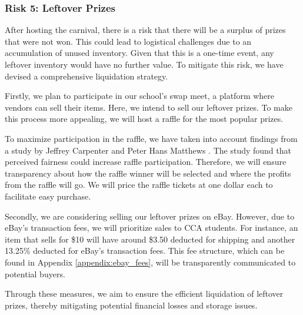 \subsubsection{Risk 5: Leftover Prizes}

After hosting the carnival, there is a risk that there will be a surplus of prizes that were not won. This could lead to logistical challenges due to an accumulation of unused inventory. Given that this is a one-time event, any leftover inventory would have no further value. To mitigate this risk, we have devised a comprehensive liquidation strategy.

Firstly, we plan to participate in our school's swap meet, a platform where vendors can sell their items. Here, we intend to sell our leftover prizes. To make this process more appealing, we will host a raffle for the most popular prizes.

To maximize participation in the raffle, we have taken into account findings from a study by Jeffrey Carpenter and Peter Hans Matthews \cite{carpenter_2017_using}. The study found that perceived fairness could increase raffle participation. Therefore, we will ensure transparency about how the raffle winner will be selected and where the profits from the raffle will go. We will price the raffle tickets at one dollar each to facilitate easy purchase.

Secondly, we are considering selling our leftover prizes on eBay. However, due to eBay's transaction fees, we will prioritize sales to CCA students. For instance, an item that sells for \$10 will have around \$3.50 deducted for shipping and another 13.25\% deducted for eBay's transaction fees. This fee structure, which can be found in Appendix \ref{appendix:ebay_fees}, will be transparently communicated to potential buyers.

Through these measures, we aim to ensure the efficient liquidation of leftover prizes, thereby mitigating potential financial losses and storage issues.
